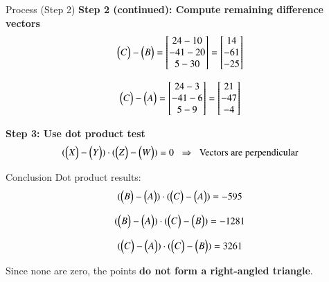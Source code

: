 \documentclass{beamer}
\begin{document}
\begin{frame}{Process (Step 2)}
\textbf{Step 2 (continued): Compute remaining difference vectors} \\
\begin{equation}
\begin{pmatrix}C\end{pmatrix}-\begin{pmatrix}B\end{pmatrix} =
\begin{bmatrix}24-10\\-41-20\\5-30\end{bmatrix} =
\begin{bmatrix}14\\-61\\-25\end{bmatrix}
\end{equation}

\begin{equation}
\begin{pmatrix}C\end{pmatrix}-\begin{pmatrix}A\end{pmatrix} =
\begin{bmatrix}24-3\\-41-6\\5-9\end{bmatrix} =
\begin{bmatrix}21\\-47\\-4\end{bmatrix}
\end{equation}

\textbf{Step 3: Use dot product test} \\
\begin{equation}
(\begin{pmatrix}X\end{pmatrix}-\begin{pmatrix}Y\end{pmatrix}) \cdot (\begin{pmatrix}Z\end{pmatrix}-\begin{pmatrix}W\end{pmatrix}) = 0 
\;\;\Rightarrow\;\; \text{Vectors are perpendicular}
\end{equation}
\end{frame}

\begin{frame}{Conclusion}
Dot product results: \\
\begin{equation}
(\begin{pmatrix}B\end{pmatrix}-\begin{pmatrix}A\end{pmatrix}) \cdot (\begin{pmatrix}C\end{pmatrix}-\begin{pmatrix}A\end{pmatrix}) = -595
\end{equation}

\begin{equation}
(\begin{pmatrix}B\end{pmatrix}-\begin{pmatrix}A\end{pmatrix}) \cdot (\begin{pmatrix}C\end{pmatrix}-\begin{pmatrix}B\end{pmatrix}) = -1281
\end{equation}

\begin{equation}
(\begin{pmatrix}C\end{pmatrix}-\begin{pmatrix}A\end{pmatrix}) \cdot (\begin{pmatrix}C\end{pmatrix}-\begin{pmatrix}B\end{pmatrix}) = 3261
\end{equation}

Since none are zero, the points \textbf{do not form a right-angled triangle}.
\end{frame}
\end{document}
